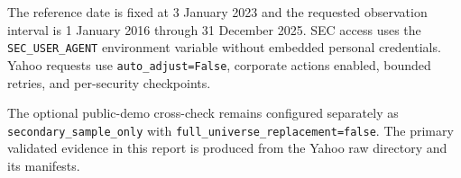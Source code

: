 
The reference date is fixed at 3 January 2023 and the requested observation interval is 1 January 2016 through 31 December 2025. SEC access uses the \texttt{SEC\_USER\_AGENT} environment variable without embedded personal credentials. Yahoo requests use \texttt{auto\_adjust=False}, corporate actions enabled, bounded retries, and per-security checkpoints.

The optional public-demo cross-check remains configured separately as \texttt{secondary\_sample\_only} with \texttt{full\_universe\_replacement=false}. The primary validated evidence in this report is produced from the Yahoo raw directory and its manifests.
